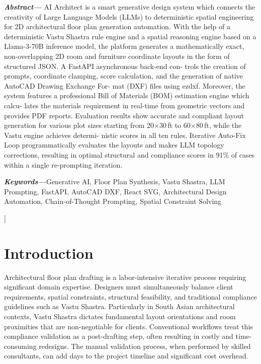 \documentclass[10pt, twocolumn, letterpaper]{article}
\begin{document}
\begin{center}
\begin{minipage}{0.92\linewidth}
\fontsize{9}{11}\selectfont
\noindent\textbf{\textit{Abstract---}}%
AI Architect is a smart generative design system which connects the creativity of Large Language Models (LLMs) to
deterministic spatial engineering for 2D architectural floor plan generation automation. With the help of a deterministic Vastu Shastra
rule engine and a spatial reasoning engine based on a Llama-3-70B inference model, the platform generates a mathematically exact,
non-overlapping 2D room and furniture coordinate layouts in the form of structured JSON. A FastAPI asynchronous back-end con-
trols the creation of prompts, coordinate clamping, score calculation, and the generation of native AutoCAD Drawing Exchange For-
mat (DXF) files using ezdxf. Moreover, the system features a professional Bill of Materials (BOM) estimation engine which calcu-
lates the materials requirement in real-time from geometric vectors and provides PDF reports. Evaluation results show accurate and
compliant layout generation for various plot sizes starting from 20$\times$30\,ft to 60$\times$80\,ft, while the Vastu engine achieves determi-
nistic scores in all ten rules. Iterative Auto-Fix Loop programmatically evaluates the layouts and makes LLM topology corrections,
resulting in optimal structural and compliance scores in 91\% of cases within a single re-prompting iteration.

\vspace{4pt}
\noindent\textbf{\textit{Keywords---}}Generative AI, Floor Plan Synthesis,
Vastu Shastra, LLM Prompting, FastAPI, AutoCAD DXF, React SVG,
Architectural Design Automation, Chain-of-Thought Prompting,
Spatial Constraint Solving
\end{minipage}

\vspace{12pt}
\end{center}
]%

\section{Introduction}

Architectural floor plan drafting is a labor-intensive iterative process requiring significant domain expertise. Designers must simultaneously balance client requirements, spatial constraints, structural feasibility, and traditional compliance guidelines such as Vastu Shastra. Particularly in South Asian architectural contexts, Vastu Shastra dictates fundamental layout orientations and room proximities that are non-negotiable for clients. Conventional workflows treat this compliance validation as a post-drafting step, often resulting in costly and time-consuming redesigns. The manual validation process, when performed by skilled consultants, can add days to the project timeline and significant cost overhead.
\end{document}

